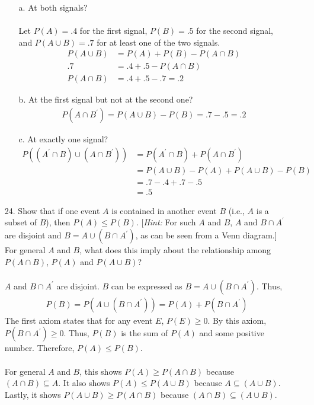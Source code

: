 \documentclass[letterpaper,12pt]{article}
\begin{document}
\begin{enumerate}
  \begin{enumerate}
      \item[a.]
        At both signals?
        \\ \\
        Let $P(A) = .4$ for the first signal, $P(B) = .5$ for the second signal, and $P(A \cup B) = .7$ for at least one of the two signals.
        \begin{align*}
          P(A \cup B) &= P(A) + P(B) - P(A \cap B) \\
          .7 &= .4 + .5 - P(A \cap B) \\
          P(A \cap B) &= .4 + .5 - .7 = .2
        \end{align*}
      \item[b.]
        At the first signal but not at the second one?
        \begin{align*}
          P(A \cap B^\prime) = P(A \cup B) - P(B) = .7 - .5 = .2
        \end{align*}
      \item[c.]
        At exactly one signal?
        \begin{align*}
          P((A^\prime \cap B) \cup (A \cap B^\prime)) &= P(A^\prime \cap B) + P(A \cap B^\prime) \\
          &= P(A \cup B) - P(A) + P(A \cup B) - P(B) \\
          &= .7 - .4 + .7 - .5 \\
          &= .5
        \end{align*}
    \end{enumerate}
  \item[24.]
    Show that if one event $A$ is contained in another event $B$ (i.e., $A$ is a subset of $B$), then $P(A) \leq P(B)$. [\textit{Hint:} For such $A$ and $B$, $A$ and $B \cap A^\prime$ are disjoint and $B = A \cup (B \cap A^\prime)$, as can be seen from a Venn diagram.] For general $A$ and $B$, what does this imply about the relationship among $P(A \cap B)$, $P(A)$ and $P(A \cup B)$?
    \\ \\
    $A$ and $B \cap A^\prime$ are disjoint. $B$ can be expressed as $B = A \cup (B \cap A^\prime)$. Thus,
    \begin{align*}
      P(B) = P(A \cup (B \cap A^\prime)) = P(A) + P(B \cap A^\prime)
    \end{align*}
    The first axiom states that for any event $E$, $P(E) \geq 0$. By this axiom, $P(B \cap A^\prime) \geq 0$. Thus, $P(B)$ is the sum of $P(A)$ and some positive number. Therefore, $P(A) \leq P(B)$.
    \\ \\
    For general $A$ and $B$, this shows $P(A) \geq P(A \cap B)$ because $(A \cap B) \subseteq A$. It also shows $P(A) \leq P(A \cup B)$ because $A \subseteq (A \cup B)$. Lastly, it shows $P(A \cup B) \geq P(A \cap B)$ because $(A \cap B) \subseteq (A \cup B)$.
\end{enumerate}
\end{document}
